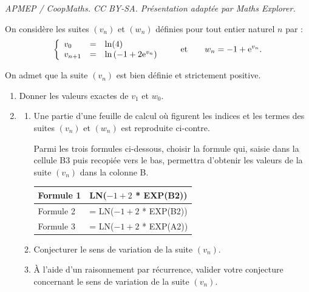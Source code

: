 \documentclass[10pt]{article}
\providecommand{\e}{{\mathrm{e}}}
\begin{document}
\noindent\textit{APMEP / CoopMaths. CC BY-SA. Présentation adaptée par Maths Explorer.}\par\medskip
\medskip


On considère les suites $(v_n)$ et $(w_n)$ définies pour tout entier naturel $n$
par :
\[ \left\{\begin{array}{l c l}
v_0 &=& \ln (4)\\
v_{n+1} &=& \ln \left(- 1 +2\e^{v_n}\right)
\end{array}\right. \qquad \text{et} \qquad w_n = - 1 + \e^{v_n}.\]

On admet que la suite $(v_n)$ est bien définie et strictement positive.

\medskip

\begin{minipage}{0.6\linewidth}
\begin{enumerate}
\item Donner les valeurs exactes de $v_1$ et $w_0$.
\item 
	\begin{enumerate}
		\item Une partie d'une feuille de calcul où figurent les indices et
les termes des suites $(v_n)$ et $(w_n)$ est reproduite ci-contre.
		
Parmi les trois formules ci-dessous, choisir la formule qui,
saisie dans la cellule B3 puis recopiée vers le bas, permettra
d'obtenir les valeurs de la suite $(v_n)$ dans la colonne B.

\begin{tabular}{|l |l|}\hline
Formule 1 &LN($-1 + 2$ * EXP(B2))\\ \hline
Formule 2 &= LN($-1 + 2$ * EXP(B2))\\ \hline
Formule 3 &= LN($-1 + 2$ * EXP(A2))\\ \hline
\end{tabular}
		\item Conjecturer le sens de variation de la suite $(v_n)$.
		\item À l'aide d'un raisonnement par récurrence, valider votre
conjecture concernant le sens de variation de la suite $(v_n)$.
	\end{enumerate}
\end{enumerate}
\end{minipage} \hfill 
\end{document}
